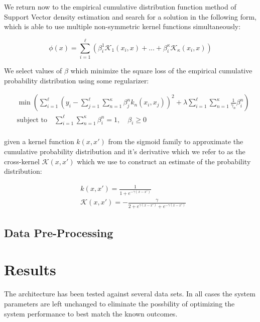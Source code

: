 \documentclass[10pt]{article}
\begin{document}
We return now to the empirical cumulative distribution function method of Support Vector density estimation and search for a solution in the following form, which is able to use multiple non-symmetric kernel functions simultaneously:

\begin{equation} \label{eq:SVDensity}
\phi(x) = \sum_{i=1}^\ell \left( \beta_i^1 \mathcal{K}_1(x_i,x) + ... + \beta_i^\kappa \mathcal{K}_\kappa( x_i,x) \right)
\end{equation}

We select values of \( \beta \) which minimize the square loss of the empirical cumulative probability distribution using some regularizer:

\begin{align}
&\min \left( \sum_{i=1}^\ell \left( y_i - \sum_{j=1}^\ell \sum_{n=1}^\kappa \beta_j^n k_n(x_i, x_j) \right)^2 + \lambda \sum_{i=1}^\ell \sum_{n=1}^\kappa \frac{1}{\gamma_n} \beta_i^n \right) \\
&\text{subject to} \quad \sum_{i=1}^\ell \sum_{n=1}^\kappa \beta_i^n = 1, \quad \beta_i \ge 0 \\
\end{align}

given a kernel function \( k(x,x') \) from the sigmoid family to approximate the cumulative probability distribution and it's derivative which we refer to as the cross-kernel \( \mathcal{K}(x,x') \) which we use to construct an estimate of the probability distribution:

\begin{align}
&k(x,x') = \frac{1}{1+e^{-\gamma(x-x')} } \\
&\mathcal{K}(x,x') = -\frac{\gamma}{2 + e^{\gamma(x-x')} + e^{-\gamma(x-x')} } 
\end{align}

\subsection{Data Pre-Processing}




\section{Results}
The architecture has been tested against several data sets.  In all cases the system parameters are left unchanged to eliminate the possbility of optimizing the system performance to best match the known outcomes.
\end{document}
